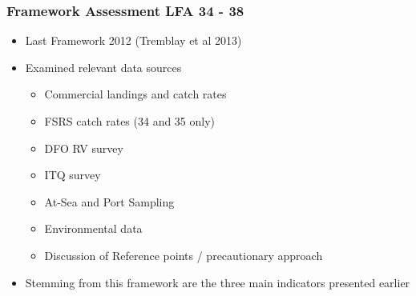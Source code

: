 \documentclass{beamer}
\begin{document}
\begin{frame}

	\frametitle{Framework Assessment LFA 34 - 38}

	\begin{itemize}
		\item Last Framework 2012 (Tremblay et al 2013)
		\item Examined relevant data sources
			\begin{itemize}
				\item Commercial landings and catch rates
				\item FSRS catch rates (34 and 35 only)
				\item DFO RV survey
				\item ITQ survey
				\item At-Sea and Port Sampling
				\item Environmental data
				\item Discussion of Reference points / precautionary approach
			\end{itemize}
		\item Stemming from this framework are the three main indicators presented earlier
	\end{itemize}
\end{frame}
\end{document}
